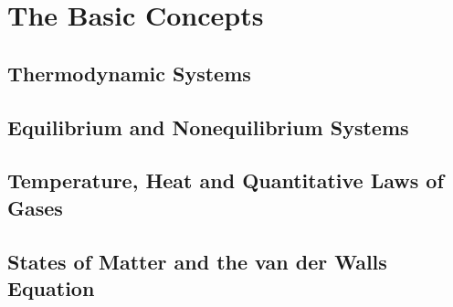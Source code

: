 \chapter{The Basic Concepts}
\section{Thermodynamic Systems}
\section{Equilibrium and Nonequilibrium Systems}
\section{Temperature, Heat and Quantitative Laws of Gases}
\section{States of Matter and the van der Walls Equation}
